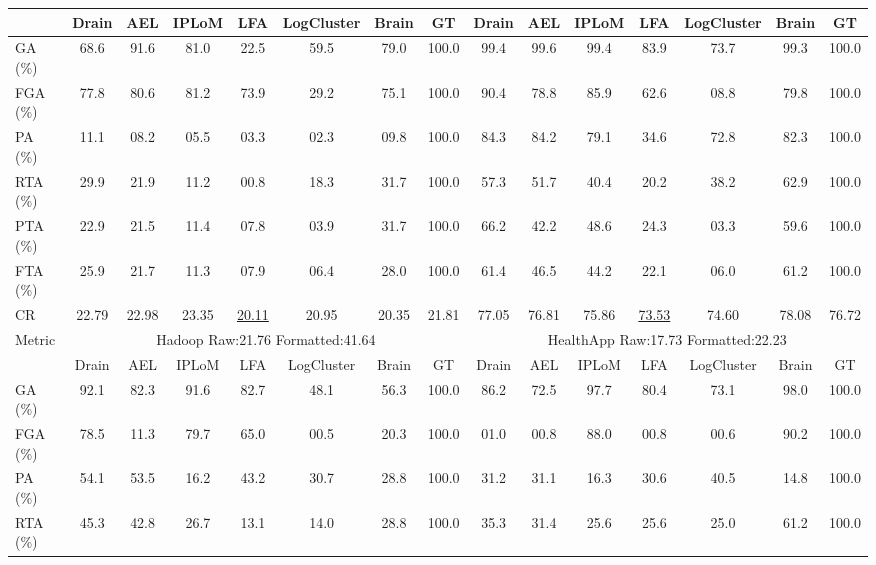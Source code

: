 \begin{table}[p]
\begin{adjustbox}{width=\textwidth,max totalheight=.86\textheight}
\begin{tabular}{l|ccccccc|ccccccc}
\cmidrule(lr){2-8} \cmidrule(lr){9-15}
& Drain & AEL & IPLoM & LFA & LogCluster & Brain & GT & Drain & AEL & IPLoM & LFA & LogCluster & Brain & GT \\
\midrule
GA (\%) & 68.6 & 91.6 & 81.0 & 22.5 & 59.5 & 79.0 & \cellcolor{lightgray}100.0 & 99.4 & 99.6 & 99.4 & 83.9 & 73.7 & 99.3 & \cellcolor{lightgray}100.0 \\
FGA (\%) & 77.8 & 80.6 & 81.2 & 73.9 & 29.2 & 75.1 & \cellcolor{lightgray}100.0 & 90.4 & 78.8 & 85.9 & 62.6 & 08.8 & 79.8 & \cellcolor{lightgray}100.0 \\
PA (\%) & 11.1 & 08.2 & 05.5 & 03.3 & 02.3 & 09.8 & \cellcolor{lightgray}100.0 & 84.3 & 84.2 & 79.1 & 34.6 & 72.8 & 82.3 & \cellcolor{lightgray}100.0 \\
RTA (\%) & 29.9 & 21.9 & 11.2 & 00.8 & 18.3 & 31.7 & \cellcolor{lightgray}100.0 & 57.3 & 51.7 & 40.4 & 20.2 & 38.2 & 62.9 & \cellcolor{lightgray}100.0 \\
PTA (\%) & 22.9 & 21.5 & 11.4 & 07.8 & 03.9 & 31.7 & \cellcolor{lightgray}100.0 & 66.2 & 42.2 & 48.6 & 24.3 & 03.3 & 59.6 & \cellcolor{lightgray}100.0 \\
FTA (\%) & 25.9 & 21.7 & 11.3 & 07.9 & 06.4 & 28.0 & \cellcolor{lightgray}100.0 & 61.4 & 46.5 & 44.2 & 22.1 & 06.0 & 61.2 & \cellcolor{lightgray}100.0 \\
CR & 22.79 & 22.98 & \cellcolor{lightgray}23.35 & \underline{20.11} & 20.95 & 20.35 & 21.81 & 77.05 & 76.81 & 75.86 & \underline{73.53} & 74.60 & \cellcolor{lightgray}78.08 & 76.72 \\
\midrule
\multirow{2}{*}{Metric} & \multicolumn{7}{c}{Hadoop Raw:21.76 Formatted:41.64} & \multicolumn{7}{c}{HealthApp Raw:17.73 Formatted:22.23} \\
\cmidrule(lr){2-8} \cmidrule(lr){9-15}
& Drain & AEL & IPLoM & LFA & LogCluster & Brain & GT & Drain & AEL & IPLoM & LFA & LogCluster & Brain & GT \\
\midrule
GA (\%) & 92.1 & 82.3 & 91.6 & 82.7 & 48.1 & 56.3 & \cellcolor{lightgray}100.0 & 86.2 & 72.5 & 97.7 & 80.4 & 73.1 & 98.0 & \cellcolor{lightgray}100.0 \\
FGA (\%) & 78.5 & 11.3 & 79.7 & 65.0 & 00.5 & 20.3 & \cellcolor{lightgray}100.0 & 01.0 & 00.8 & 88.0 & 00.8 & 00.6 & 90.2 & \cellcolor{lightgray}100.0 \\
PA (\%) & 54.1 & 53.5 & 16.2 & 43.2 & 30.7 & 28.8 & \cellcolor{lightgray}100.0 & 31.2 & 31.1 & 16.3 & 30.6 & 40.5 & 14.8 & \cellcolor{lightgray}100.0 \\
RTA (\%) & 45.3 & 42.8 & 26.7 & 13.1 & 14.0 & 28.8 & \cellcolor{lightgray}100.0 & 35.3 & 31.4 & 25.6 & 25.6 & 25.0 & 61.2 & \cellcolor{lightgray}100.0 \\

\end{tabular}
\end{adjustbox}
\end{table}
